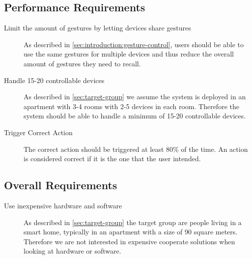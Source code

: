 
\subsection{Performance Requirements}

\begin{description}
\item[Limit the amount of gestures by letting devices share gestures] As described in \cref{sec:introduction:gesture-control}, users should be able to use the same gestures for multiple devices and thus reduce the overall amount of gestures they need to recall.
\item[Handle 15-20 controllable devices] As described in \cref{sec:target-group} we assume the system is deployed in an apartment with 3-4 rooms with 2-5 devices in each room. Therefore the system should be able to handle a minimum of 15-20 controllable devices.
\item[Trigger Correct Action] The correct action should be triggered at least 80\% of the time. An action is considered correct if it is the one that the user intended.
\end{description}

\subsection{Overall Requirements}

\begin{description}
\item[Use inexpensive hardware and software] As described in \cref{sec:target-group} the target group are people living in a smart home, typically in an apartment with a size of 90 square meters. Therefore we are not interested in expensive cooperate solutions when looking at hardware or software.
\end{description}

